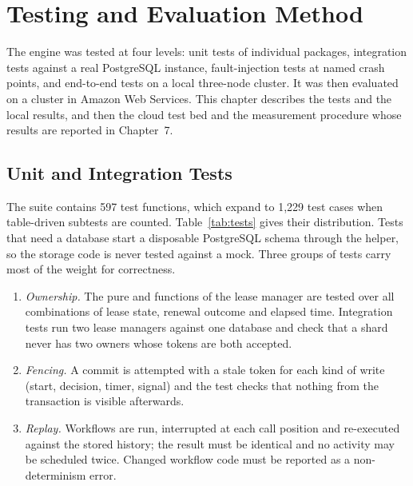 \clearpage
\chapter{Testing and Evaluation Method}

The engine was tested at four levels: unit tests of individual packages,
integration tests against a real PostgreSQL instance, fault-injection tests at
named crash points, and end-to-end tests on a local three-node cluster. It was
then evaluated on a cluster in Amazon Web Services. This chapter describes the
tests and the local results, and then the cloud test bed and the measurement
procedure whose results are reported in Chapter~7.

\section{Unit and Integration Tests}

The suite contains 597 test functions, which expand to 1,229 test cases when
table-driven subtests are counted. Table~\ref{tab:tests} gives their
distribution. Tests that need a database start a disposable PostgreSQL
schema through the  helper, so the storage code is never tested
against a mock. Three groups of tests carry most of the weight for
correctness.

\begin{enumerate}[leftmargin=*, itemsep=2pt]
  \item \emph{Ownership.} The pure  and  functions of
    the lease manager are tested over all combinations of lease state,
    renewal outcome and elapsed time. Integration tests run two lease
    managers against one database and check that a shard never has two
    owners whose tokens are both accepted.
  \item \emph{Fencing.} A commit is attempted with a stale token for each
    kind of write (start, decision, timer, signal) and the test checks that
    nothing from the transaction is visible afterwards.
  \item \emph{Replay.} Workflows are run, interrupted at each call position
    and re-executed against the stored history; the result must be identical
    and no activity may be scheduled twice. Changed workflow code must be
    reported as a non-determinism error.
\end{enumerate}

